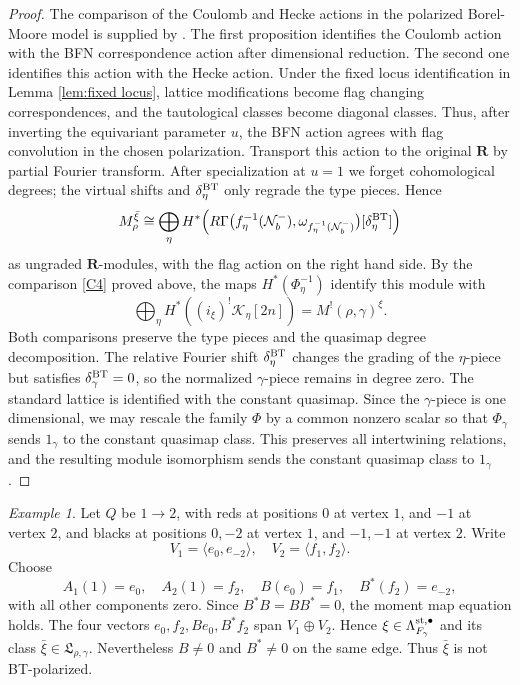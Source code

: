 \documentclass[11pt,reqno]{amsart}
\theoremstyle{definition}
\theoremstyle{remark}
\newtheorem{Example}[Theorem]{Example}
\def\calN{\mathcal N}
\def\bR{\mathbf R}
\begin{document}
\begin{proof}
The comparison of the Coulomb and Hecke actions in the polarized
Borel-Moore model is supplied by \cite[Props.~2.4.8, 3.2.2]{BT26}.
The first proposition identifies the Coulomb action with the BFN
correspondence action after dimensional reduction. The second one identifies
this action with the Hecke action. Under the fixed locus identification in Lemma \ref{lem:fixed locus}, 
lattice modifications become flag changing
correspondences, and the tautological classes become diagonal classes. 
Thus, after inverting the equivariant parameter $u$, the BFN action agrees with flag
convolution in the chosen polarization. Transport this action to the
original $\bR$ by partial Fourier transform.
After specialization at $u=1$ we forget cohomological degrees;
the virtual shifts and $\delta_\eta^{\rm BT}$ only regrade the type
pieces. Hence
\[
 M^{\bar\xi}_\rho
 \cong\bigoplus_\eta H^*\!\left(
 R\Gamma\bigl(f_\eta^{-1}(\calN_b^-),
       \omega_{f_\eta^{-1}(\calN_b^-)}\bigr)
       [\delta_\eta^{\rm BT}]\right)
\]
as ungraded $\bR$-modules, with the flag action on the right hand side.
By the comparison \eqref{C4} proved above, the maps
$H^*(\Phi_\eta^{-1})$ identify this module with
\[
 \bigoplus_\eta H^*((i_\xi)^!\mathcal K_\eta[2n])
 =M^!(\rho,\gamma)^\xi.
\]
Both comparisons preserve the type pieces and the quasimap degree
decomposition. The relative Fourier shift $\delta_\eta^{\rm BT}$
changes the grading of the $\eta$-piece but satisfies
$\delta_\gamma^{\rm BT}=0$, so the normalized $\gamma$-piece
remains in degree zero. The standard lattice is
identified with the constant quasimap. Since the $\gamma$-piece
is one dimensional, we may rescale
the family $\Phi$ by a common nonzero scalar so that
$\Phi_\gamma$ sends $1_\gamma$ to the constant quasimap class.
This preserves all intertwining relations, and the resulting module
isomorphism sends the constant quasimap class to $1_\gamma$.
\end{proof}


\begin{Example}\label{ex:non-BT-point}
Let $Q$ be $1\to2$, with reds at positions $0$ at vertex $1$,
and $-1$ at vertex $2$, and blacks at positions $0,-2$ at vertex $1$,
and $-1,-1$ at vertex $2$.
Write 
$$V_1=\langle e_0,e_{-2}\rangle
,\quad
V_2=\langle f_1,f_2\rangle.$$
Choose
\[
 A_1(1)=e_0,\quad A_2(1)=f_2,\quad
 B(e_0)=f_1,\quad B^*(f_2)=e_{-2},
\]
with all other components zero. Since $B^*B=BB^*=0$, the
moment map equation holds. The four vectors
$e_0,f_2,Be_0,B^*f_2$  span $V_1\oplus V_2$. Hence
$\xi\in\Lambda_{F_\gamma}^{\rm st,\bullet}$ and its class $\bar\xi\in\mathfrak L_{\rho,\gamma}$.
Nevertheless $B\ne0$ and $B^*\ne0$ on the same edge.
Thus $\bar\xi$ is not BT-polarized.
\end{Example}
\end{document}
